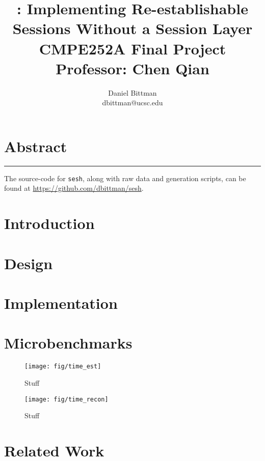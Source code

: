 \documentclass[twocolumn,10pt]{article}
\author{Daniel Bittman \\ dbittman@ucsc.edu}
\title{\sesh: \textbf{Implementing Re-establishable\\Sessions Without a Session Layer}
\\
{\vspace{5mm}\normalsize CMPE252A Final Project\\\vspace{-3mm} Professor: Chen Qian}
}
\newcommand{\sesh}{\texttt{sesh}\xspace}
\begin{document}
\biolinum
\maketitle
\libertine
\renewcommand\ttdefault{lmtt}

\section*{Abstract}


\begin{center}\noindent\rule{2cm}{0.4pt}\end{center}

The source-code for \sesh, along with raw data and generation scripts,
can be found at \url{https://github.com/dbittman/sesh}.

\section{Introduction}





\section{Design}



\section{Implementation}



\section{Microbenchmarks}


\begin{figure}
	\centering
	\texttt{[image: fig/time\_est]}
	\caption{Stuff}
	\label{fig:est}
\end{figure}

\begin{figure}
	\centering
	\texttt{[image: fig/time\_recon]}
	\caption{Stuff}
	\label{fig:recon}
\end{figure}




\section{Related Work}
\end{document}
